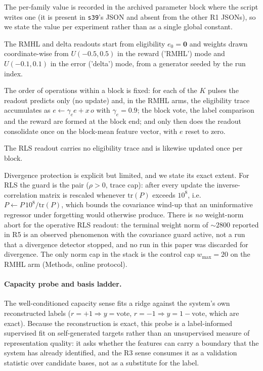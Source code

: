 \documentclass[preprint,12pt]{elsarticle}
\begin{document}
The
per-family value is recorded in the
archived parameter block where the script writes one (it is present in
\texttt{s39}'s JSON and absent from the other R1 JSONs), so we state the value
per experiment rather than as a single global constant.

The RMHL and delta
readouts start from eligibility $e_0=\mathbf 0$ and weights drawn
coordinate-wise from $U(-0.5,0.5)$ in the reward ('RMHL') mode and
$U(-0.1,0.1)$ in the error ('delta') mode, from a generator seeded by the run
index.

The order of operations within a block is fixed: for each of the $K$
pulses the readout predicts only (no update) and, in the RMHL arms, the
eligibility trace accumulates as $e\leftarrow\gamma_e e+x\,o$ with
$\gamma_e=0.9$; the block vote, the label comparison and the reward are formed
at the block end; and only then does the readout consolidate once on the
block-mean feature vector, with $e$ reset to zero.

The RLS readout carries no
eligibility trace and is likewise updated once per block.

Divergence
protection is explicit but limited, and we state its exact extent. For RLS the
guard is the pair ($\rho>0$, trace cap): after every update the
inverse-correlation matrix is rescaled whenever $\mathrm{tr}(P)$ exceeds
$10^{8}$, i.e.\ $P\leftarrow P\,10^{8}/\mathrm{tr}(P)$, which bounds the
covariance wind-up that an uninformative regressor under forgetting would
otherwise produce. There is \emph{no} weight-norm abort for the operative RLS
readout: the terminal weight norm of $\sim2800$ reported in R5 is an observed
phenomenon with the covariance guard active, not a run that a divergence
detector stopped, and no run in this paper was discarded for divergence. The
only norm cap in the stack is the control cap $w_{\max}=20$ on the RMHL arm
(Methods, online protocol).

\paragraph{Capacity probe and basis ladder.} The well-conditioned capacity
sense fits a ridge against the system's own reconstructed labels
($r=+1\Rightarrow y=\mathrm{vote}$, $r=-1\Rightarrow y=1-\mathrm{vote}$,
which are exact). Because the reconstruction is exact, this probe is a
label-informed supervised fit on self-generated targets rather than an
unsupervised measure of representation quality: it asks whether the features
can carry a boundary that the system has already identified, and the R3
sense consumes it as a validation statistic over candidate bases, not as a
substitute for the label.
\end{document}
